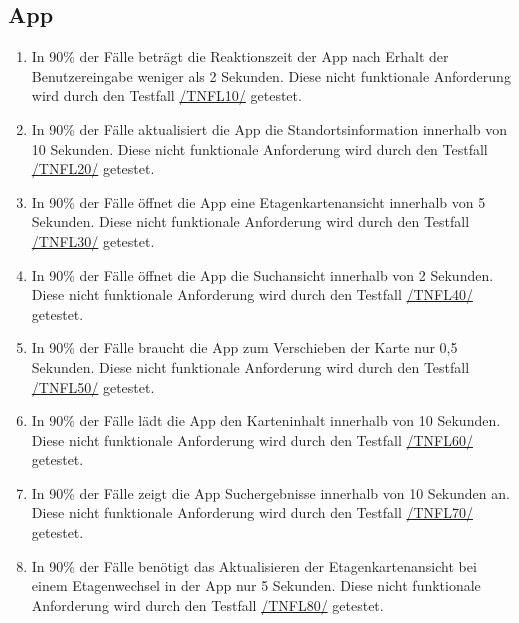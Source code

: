 \subsection*{App}

\begin{samepage}
    \begin{enumerate}[label=\textbf{/NFL\arabic*0/}, align=left]
        \item \label{/NFL10/} In 90\% der Fälle beträgt die \Gls{Reaktionszeit} der App nach Erhalt der \Gls{Benutzereingabe} weniger als 2 Sekunden. Diese nicht funktionale Anforderung wird durch den Testfall \hyperref[/TNFL10/]{/TNFL10/} getestet.
        \item \label{/NFL20/} In 90\% der Fälle aktualisiert die App die Standortsinformation innerhalb von 10 Sekunden. Diese nicht funktionale Anforderung wird durch den Testfall \hyperref[/TNFL20/]{/TNFL20/} getestet.
        \item \label{/NFL30/} In 90\% der Fälle öffnet die App eine \Gls{Etagenkartenansicht} innerhalb von 5 Sekunden. Diese nicht funktionale Anforderung wird durch den Testfall \hyperref[/TNFL30/]{/TNFL30/} getestet.
        \item \label{/NFL40/} In 90\% der Fälle öffnet die App die \Gls{Suchansicht} innerhalb von 2 Sekunden. Diese nicht funktionale Anforderung wird durch den Testfall \hyperref[/TNFL40/]{/TNFL40/} getestet.
        \item \label{/NFL50/} In 90\% der Fälle braucht die App zum Verschieben der \Gls{Karte} nur 0,5 Sekunden. Diese nicht funktionale Anforderung wird durch den Testfall \hyperref[/TNFL50/]{/TNFL50/} getestet.
        \item \label{/NFL60/} In 90\% der Fälle lädt die App den Karteninhalt innerhalb von 10 Sekunden. Diese nicht funktionale Anforderung wird durch den Testfall \hyperref[/TNFL60/]{/TNFL60/} getestet.
        \item \label{/NFL70/} In 90\% der Fälle zeigt die App Suchergebnisse innerhalb von 10 Sekunden an. Diese nicht funktionale Anforderung wird durch den Testfall \hyperref[/TNFL70/]{/TNFL70/} getestet.
        \item \label{/NFL80/} In 90\% der Fälle benötigt das Aktualisieren der \Gls{Etagenkartenansicht} bei einem \Gls{Etagenwechsel} in der App nur 5 Sekunden. Diese nicht funktionale Anforderung wird durch den Testfall \hyperref[/TNFL80/]{/TNFL80/} getestet.
    \end{enumerate}
\end{samepage}